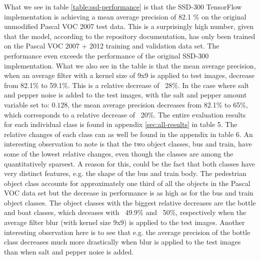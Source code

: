 \documentclass{article}
\begin{document}
What we see in table \ref{table:ssd-performance} is that the SSD-300 TensorFlow implementation is achieving a mean average precision of 82.1 \% on the original unmodified Pascal VOC 2007 test data. This is a surprisingly high number, given that the model, according to the repository documentation, has only been trained on the Pascal VOC 2007 + 2012 training and validation data set. The performance even exceeds the performance of the original SSD-300 implementation. 
What we also see in the table is that the mean average precision, when an average filter with a kernel size of 9x9 is applied to test images, decrease from 82.1\% to 59.1\%. This is a relative decrease of ~28\%. In the case where salt and pepper noise is added to the test images, with the salt and pepper amount variable set to: $0.128$, the mean average precision decreases from 82.1\% to 65\%, which corresponds to a relative decrease of ~20\%. The entire evaluation results for each individual class is found in appendix \ref{sec:all-results} in table 5. The relative changes of each class can as well be found in the appendix in table 6. An interesting observation to note is that the two object classes, bus and train, have some of the lowest relative changes, even though the classes are among the quantitatively sparsest. A reason for this, could be the fact that both classes have very distinct features, e.g. the shape of the bus and train body. The pedestrian object class accounts for approximately one third of all the objects in the Pascal VOC data set but the decrease in performance is as high as for the bus and train object classes. The object classes with the biggest relative decreases are the bottle and boat classes, which deceases with ~49.9\% and ~50\%, respectively when the average filter blur (with kernel size 9x9) is applied to the test images. Another interesting observation here is to see that e.g. the average precision of the bottle class decreases much more drastically when blur is applied to the test images than when salt and pepper noise is added.

%
%
%
\end{document}
